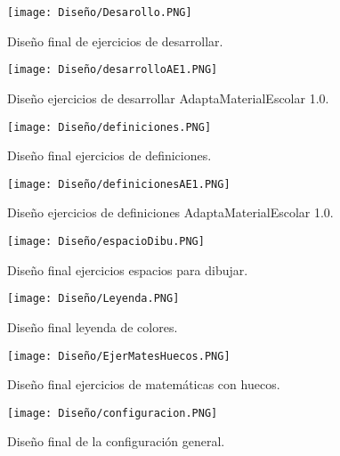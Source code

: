 \begin{figure}[ht!]
  \centering
  \texttt{[image: Diseño/Desarollo.PNG]}
  \caption{Diseño final de ejercicios de desarrollar.}
  \label{Desarrollo}
\end{figure}

\begin{figure}[ht!]
  \centering
  \texttt{[image: Diseño/desarrolloAE1.PNG]}
  \caption{Diseño ejercicios de desarrollar AdaptaMaterialEscolar 1.0.}
  \label{desAE1}
\end{figure}

\begin{figure}[ht!]
  \centering
  \texttt{[image: Diseño/definiciones.PNG]}
  \caption{Diseño final ejercicios de definiciones.}
  \label{defi}
\end{figure}

\begin{figure}[ht!]
  \centering
  \texttt{[image: Diseño/definicionesAE1.PNG]}
  \caption{Diseño ejercicios de definiciones AdaptaMaterialEscolar 1.0.}
  \label{defiAE1}
\end{figure}

\begin{figure}[ht!]
  \centering
  \texttt{[image: Diseño/espacioDibu.PNG]}
  \caption{Diseño final ejercicios espacios para dibujar.}
  \label{espaciosDibu}
\end{figure}

\begin{figure}[ht!]
  \centering
  \texttt{[image: Diseño/Leyenda.PNG]}
  \caption{Diseño final leyenda de colores.}
  \label{LeyendaColores}
\end{figure}


\begin{figure}[ht!]
  \centering
  \texttt{[image: Diseño/EjerMatesHuecos.PNG]}
  \caption{Diseño final ejercicios de matemáticas con huecos.}
  \label{matesHueco}
\end{figure}

\begin{figure}[ht!]
  \centering
  \texttt{[image: Diseño/configuracion.PNG]}
  \caption{Diseño final de la configuración general.}
  \label{configu}
\end{figure}




